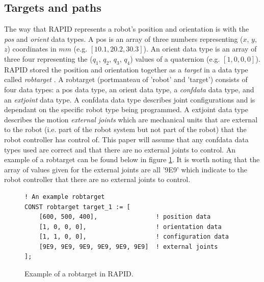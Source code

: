 \documentclass{cslthse-msc}
\begin{document}
\subsection{Targets and paths}
\label{sec:Tech_Back:Rob_Move:target_path}
The way that RAPID represents a robot's position and orientation is with the \textit{pos} and \textit{orient} data types. A pos \cite[Sec. 3.56]{ABB:rapid_instructions} is an array of three numbers representing ($x$, $y$, $z$) coordinates in $mm$ (e.g. $[10.1, 20.2, 30.3]$). An orient data type \cite[Sec. 3.52]{ABB:rapid_instructions} is an array of three four representing the ($q_1$, $q_2$, $q_3$, $q_4$) values of a quaternion (e.g. $[1, 0, 0, 0]$). RAPID stored the position and orientation together as a \textit{target} in a data type called \textit{robtarget} \cite[Sec. 3.67]{ABB:rapid_instructions}. A robtarget (portmanteau of 'robot' and 'target') consists of four data types: a pos data type, an orient data type, a \textit{confdata} \cite[Sec. 3.17]{ABB:rapid_instructions} data type, and an \textit{extjoint}\cite[Sec. 3.34]{ABB:rapid_instructions} data type. A confdata data type describes joint configurations and is dependant on the specific robot type being programmed. A extjoint data type describes the motion \textit{external joints} which are mechanical units that are external to the robot (i.e. part of the robot system but not part of the robot) that the robot controller has control of. This paper will assume that any confdata data types used are correct and that there are no external joints to control. An example of a robtarget can be found below in figure \ref{fig:RAPID_robtarget}. It is worth noting that the array of values given for the external joints are all '9E9' which indicate to the robot controller that there are no external joints to control. 

\lstset{language=RAPID}
\begin{figure}[H]
\centering
\begin{lstlisting}
! An example robtarget
CONST robtarget target_1 := [ 
    [600, 500, 400],                ! position data
    [1, 0, 0, 0],                   ! orientation data
    [1, 1, 0, 0],                   ! configuration data
    [9E9, 9E9, 9E9, 9E9, 9E9, 9E9]  ! external joints
];

\end{lstlisting}
\caption{Example of a robtarget in RAPID.}
\label{fig:RAPID_robtarget}
\end{figure}
\end{document}
